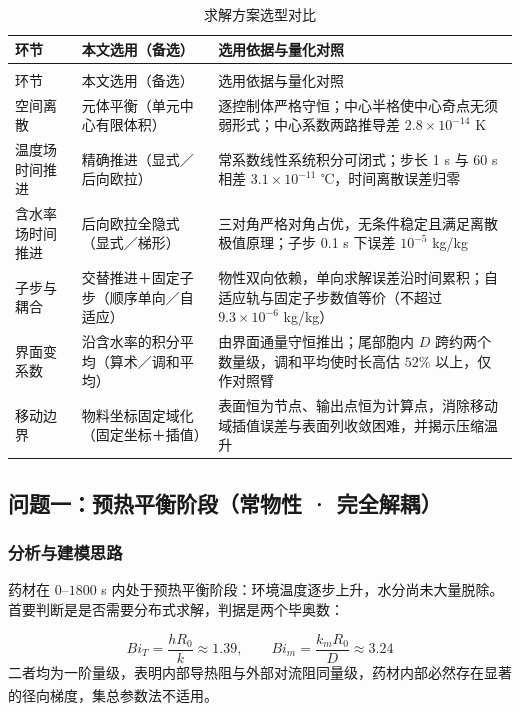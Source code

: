 \begin{longtable}{>{\raggedright\arraybackslash}m{\dimexpr 0.174\tblw\relax}>{\raggedright\arraybackslash}m{\dimexpr 0.306\tblw\relax}>{\raggedright\arraybackslash}m{\dimexpr 0.520\tblw\relax}}
  \caption{求解方案选型对比}\label{tab:5-1}\\
  \toprule
    环节 & 本文选用（备选） & 选用依据与量化对照 \\
  \midrule
  \endfirsthead
  \multicolumn{3}{r}{\footnotesize（续）}\\
  \toprule
    环节 & 本文选用（备选） & 选用依据与量化对照 \\
  \midrule
  \endhead
  \bottomrule
  \endfoot
  \bottomrule
  \endlastfoot
  空间离散 & 元体平衡（单元中心有限体积） & 逐控制体严格守恒；中心半格使中心奇点无须弱形式；中心系数两路推导差 $2.8\times10^{-14}$ K \\
  温度场时间推进 & 精确推进（显式／后向欧拉） & 常系数线性系统积分可闭式；步长 1 s 与 60 s 相差 $3.1\times10^{-11}$ ℃，时间离散误差归零 \\
  含水率场时间推进 & 后向欧拉全隐式（显式／梯形） & 三对角严格对角占优，无条件稳定且满足离散极值原理；子步 0.1 s 下误差 $10^{-5}$ kg/kg \\
  子步与耦合 & 交替推进＋固定子步（顺序单向／自适应） & 物性双向依赖，单向求解误差沿时间累积；自适应轨与固定子步数值等价（不超过 $9.3\times10^{-6}$ kg/kg） \\
  界面变系数 & 沿含水率的积分平均（算术／调和平均） & 由界面通量守恒推出；尾部胞内 $D$ 跨约两个数量级，调和平均使时长高估 $52\%$ 以上，仅作对照臂 \\
  移动边界 & 物料坐标固定域化（固定坐标＋插值） & 表面恒为节点、输出点恒为计算点，消除移动域插值误差与表面列收敛困难，并揭示压缩温升 \\
\end{longtable}

\subsection{问题一：预热平衡阶段（常物性 · 完全解耦）}
\subsubsection{分析与建模思路}
药材在 $0$–$1800$ s 内处于预热平衡阶段：环境温度逐步上升，水分尚未大量脱除。首要判断是是否需要分布式求解，判据是两个毕奥数：

\begin{equation}
  Bi_T=\frac{hR_0}{k}\approx1.39,\qquad Bi_m=\frac{k_mR_0}{D}\approx3.24
  \label{eq:5-14}
\end{equation}
二者均为一阶量级，表明内部导热阻与外部对流阻同量级，药材内部必然存在显著的径向梯度，集总参数法不适用\textsuperscript{\cite{ref1,ref8}}。


